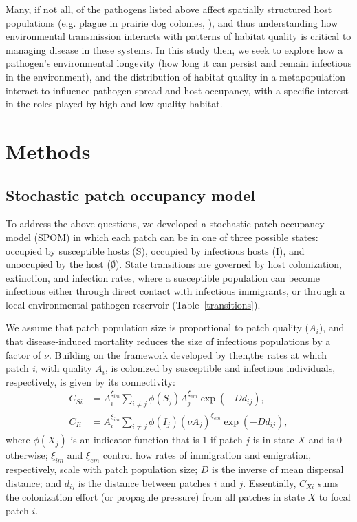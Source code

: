 \documentclass{article}
\begin{document}
Many, if not all, of the pathogens listed above affect spatially structured host populations (e.g. plague in prairie dog colonies, \cite{George2013}), and thus understanding how environmental transmission interacts with patterns of habitat quality is critical to managing disease in these systems.  In this study then, we seek to explore how a pathogen's environmental longevity (how long it can persist and remain infectious in the environment), and the distribution of habitat quality in a metapopulation interact to influence pathogen spread and host occupancy, with a specific interest in the roles played by high and low quality habitat.  

\section{Methods}
\label{methods}

\subsection{Stochastic patch occupancy model}


To address the above questions, we developed a stochastic patch occupancy model (SPOM) in which each patch can be in one of three possible states: occupied by susceptible hosts (S), occupied by infectious hosts (I), and unoccupied by the host ($\emptyset$).  State transitions are governed by host colonization, extinction, and infection rates, where a susceptible population can become infectious either through direct contact with infectious immigrants, or through a local environmental pathogen reservoir (Table~\ref{transitions}).

We assume that patch population size is proportional to patch quality ($A_i$), and that disease-induced mortality reduces the size of infectious populations by a factor of $\nu$.  Building on the framework developed by \cite{Hanski2003} then,the rates at which patch \emph{i}, with quality $A_i$, is colonized by susceptible and infectious individuals, respectively, is given by its connectivity:
\begin{align}
C_{Si} &= A_i^{\xi_{im}} \sum_{i\neq j }\phi(S_j)A_j^{\xi_{em}}\exp(-D d_{ij}),\\
C_{Ii} &= A_i^{\xi_{im}} \sum_{i\neq j }\phi(I_j)(\nu A_j) ^{\xi_{em}}\exp(-D d_{ij}),
\label{connectivity}
\end{align}
where $\phi(X_j)$ is an indicator function that is $1$ if patch $j$ is in state $X$ and is $0$ otherwise; $\xi_{im}$ and $\xi_{em}$ control how rates of immigration and emigration, respectively, scale with patch population size; $D$ is the inverse of mean dispersal distance; and $d_{ij}$ is the distance between patches $i$ and $j$.  Essentially, $C_{Xi}$ sums the colonization effort (or propagule pressure) from all patches in state $X$ to focal patch $i$.  
\end{document}
